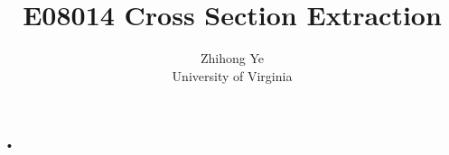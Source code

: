 \begin{flushleft}
•
\end{flushleft}\documentclass[a4paper,10.5pt]{report}
\makeindex
\usepackage{booktabs}
\usepackage{epsfig}
\usepackage{graphicx}
\usepackage{epstopdf}
\usepackage{amsmath}
\usepackage{rotating}
\usepackage{caption}
\usepackage{subfig}

 true cm
 true cm
\def\marginset#1#2{
\setlength{\oddsidemargin}{#1}
\iffalse
\reversemarginpar
\addtolength{\oddsidemargin}{\marginparsep}
\addtolength{\oddsidemargin}{\marginparwidth}
\fi

  \setlength{\evensidemargin}{0mm}
\iffalse
\addtolength{\evensidemargin}{\marginparsep}
\addtolength{\evensidemargin}{\marginparwidth}
\fi

\setlength{\hoffset}{\paperwidth}
\addtolength{\hoffset}{-\oddsidemargin}
\addtolength{\hoffset}{-\textwidth}
\addtolength{\hoffset}{-\evensidemargin}
\setlength{\hoffset}{0.5\hoffset}
\addtolength{\hoffset}{-1in}           %

  \setlength{\voffset}{-1in}             %
\setlength{\topmargin}{\paperheight}
\addtolength{\topmargin}{-\headheight}
\addtolength{\topmargin}{-\headsep}
\addtolength{\topmargin}{-\textheight}
\addtolength{\topmargin}{-\footskip}
\addtolength{\topmargin}{#2}
\setlength{\topmargin}{0.5\topmargin}
}

\marginset{10mm}{12mm}
\title{E08014 Cross Section Extraction}
\author{Zhihong Ye\\ University of Virginia}



\section{Yield Ratio Method:} 
The following results are obtained by using Yield Ratio Method to extract Cross Sections. Comparing Yield distribution and the Yield Ratio at each kinematics setting are also given.

The Yield of Experiment Data is written as:
\begin{equation}
   Y^{i}_{EX} =  ,
 \label{eqyex}
\end{equation}
where $N^{i}_{EX}$ is the total number of events in the $ith$ $x_{bj}$ bin after all cuts, $N_{e}$ is the total charge for all runs and $\epsilon_{eff}$ is the total efficiency, including detection and PID cuts, and the values are set to one as we discussed earlier. A factor of $10^{33}$ is applied on this yield to match the unit of Monte Carlo Yield.

